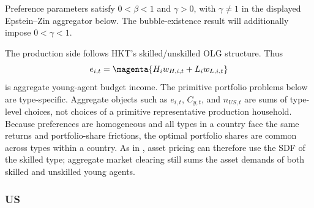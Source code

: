 \documentclass{article}
\begin{document}
Preference parameters satisfy $0<\beta<1$ and $\gamma>0$, with $\gamma\ne1$ in the displayed Epstein--Zin aggregator below.  The bubble-existence result will additionally impose $0<\gamma<1$.

The production side follows HKT's skilled/unskilled OLG structure.  Thus
\[
e_{i,t}=\magenta{H_iw_{H,i,t}+L_iw_{L,i,t}}
\]
is aggregate young-agent budget income. The primitive portfolio problems below are type-specific. Aggregate objects such as $e_{i,t}$, $C_{y,t}$, and $n_{US,t}$ are sums of type-level choices, not choices of a primitive representative production household. Because preferences are homogeneous and all types in a country face the same returns and portfolio-share frictions, the optimal portfolio shares are common across types within a country. As in \citet{hirano2025technological}, asset pricing can therefore use the SDF of the skilled type; aggregate market clearing still sums the asset demands of both skilled and unskilled young agents.

\subsubsection{US}
\end{document}
